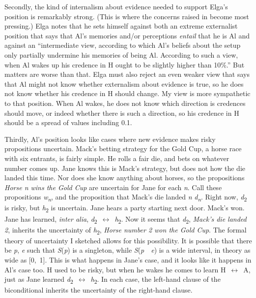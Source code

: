 Secondly, the kind of internalism about evidence needed to support Elga's position is remarkably strong. (This is where the concerns raised in  become most pressing.) Elga notes that he sets himself against both an extreme externalist position that says that Al's memories and/or perceptions \textit{entail} that he is Al and against an ``intermediate view, according to which Al's beliefs about the setup only partially undermine his memories of being Al. According to such a view, when Al wakes up his credence in H ought to be slightly higher than 10\%.'' But matters are worse than that. Elga must also reject an even weaker view that says that Al might not know whether externalism about evidence is true, so he does not know whether his credence in H should change. My view is more sympathetic to that position. When Al wakes, he does not know which direction is credences should move, or indeed whether there is such a direction, so his credence in H should be a spread of values including 0.1.

Thirdly, Al's position looks like cases where new evidence makes risky propositions uncertain. Mack's betting strategy for the Gold Cup, a horse race with six entrants, is fairly simple. He rolls a fair die, and bets on whatever number comes up. Jane knows this is Mack's strategy, but does not how the die landed this time. Nor does she know anything about horses, so the propositions \textit{Horse n wins the Gold Cup} are uncertain for Jane for each \textit{n}. Call these propositions \textit{w}\textit{\textsubscript{n}}, and the proposition that Mack's die landed \textit{n} \textit{d}\textit{\textsubscript{n}}. Right now, \textit{d}\textsubscript{2} is risky, but \textit{h}\textsubscript{2} is uncertain. Jane hears a party starting next door. Mack's won. Jane has learned, \textit{inter alia}, \textit{d}\textsubscript{2}~$\leftrightarrow$~\textit{h}\textsubscript{2}. Now it seems that \textit{d}\textsubscript{2}, \textit{Mack's die landed 2}, inherits the uncertainty of \textit{h}\textsubscript{2}, \textit{Horse number 2 won the Gold Cup}. The formal theory of uncertainty I sketched allows for this possibility. It is possible that there be \textit{p}, \textit{e} such that \textit{S}(\textit{p}) is a singleton, while \textit{S}(\textit{p}~{\textbar}~\textit{e}) is a wide interval, in theory as wide as [0,~1]. This is what happens in Jane's case, and it looks like it happens in Al's case too. H used to be risky, but when he wakes he comes to learn H~${\leftrightarrow}$~A, just as Jane learned \textit{d}\textsubscript{2}~$\leftrightarrow$~\textit{h}\textsubscript{2}. In each case, the left-hand clause of the biconditional inherits the uncertainty of the right-hand clause. 

